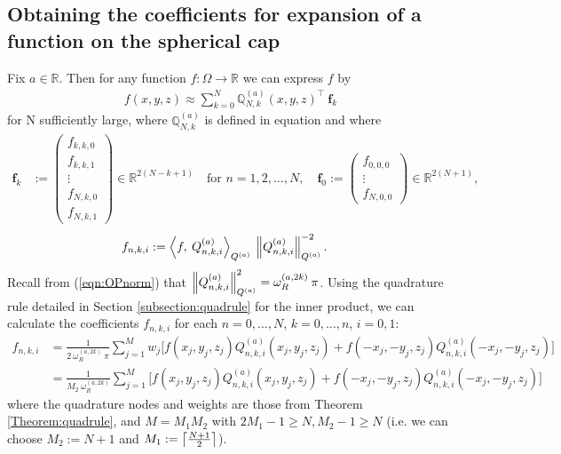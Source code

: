 \documentclass[11pt, oneside]{article}   	%
\newcommand{\R}{\mathbb{R}}
\newcommand{\genjac}{R}
\newcommand{\normgenjac}{\omega_\genjac}
\newcommand{\scop}{Q}
\newcommand{\scopnki}{\scop_{n,k,i}}
\newcommand{\scopa}{\scop^{(a)}}
\newcommand{\scopnkia}{\scopnki^{(a)}}
\newcommand{\bigscop}{{\mathbb{Q}}}
\newcommand{\bigscopa}{\bigscop^{(a)}}
\newcommand{\bigscopNka}{\bigscopa_{N,k}}
\begin{document}
\subsection{Obtaining the coefficients for expansion of a function on the spherical cap}\label{subsection:expandingfunctions}

Fix $a \in \R$. Then for any function $f : \Omega \to \R$ we can express $f$ by
\begin{align*}
	f(x,y,z) \approx \sum_{k=0}^N \bigscopNka(x,y,z)^\top \: \mathbf{f}_k
\end{align*}
for N sufficiently large, where $\bigscopNka$ is defined in equation \label{eqn:OPdefNka} and where
\begin{align*}
	\mathbf{f}_k &:= 
		\begin{pmatrix}
			f_{k,k,0} \\
			f_{k,k,1} \\
			\vdots \\
			f_{N,k,0} \\
			f_{N,k,1}
		\end{pmatrix} \in \R^{2(N-k+1)} \quad \text{for } n = 1,2,\dots,N, \quad
	\mathbf{f}_0 := 
		\begin{pmatrix}
			f_{0,0,0} \\
			\vdots \\
			f_{N,0,0}
		\end{pmatrix} \in \R^{2(N+1)},
\end{align*}
\begin{align*}
	f_{n,k,i} &:= \ip< f, \: \scopnkia>_{\scopa} \: \norm{\scopnkia}^{-2}_{\scopa}.
\end{align*}
Recall from (\ref{eqn:OPnorm}) that $\norm{\scopnkia}^2_{\scopa} = \normgenjac^{(a,2k)} \: \pi$. Using the quadrature rule detailed in Section \ref{subsection:quadrule} for the inner product, we can calculate the coefficients $f_{n,k,i}$ for each $n = 0,\dots,N$, $k = 0,\dots,n$, $i = 0,1$: 
\begin{align*}
	f_{n,k,i} &= \frac{1}{2 \: \normgenjac^{(a,2k)} \: \pi} \sum_{j=1}^{M} w_j \big[ f(x_j, y_j, z_j) \scopnkia(x_j, y_j, z_j) +f(-x_j, -y_j, z_j) \scopnkia(-x_j, -y_j, z_j) \big] \\
	&= \frac{1}{M_2 \: \normgenjac^{(a,2k)}} \sum_{j=1}^{M} \big[ f(x_j, y_j, z_j) \scopnkia(x_j, y_j, z_j) +f(-x_j, -y_j, z_j) \scopnkia(-x_j, -y_j, z_j) \big]
\end{align*}
where the quadrature nodes and weights are those from Theorem \ref{Theorem:quadrule}, and $M = M_1 M_2$ with $2M_1 - 1 \ge N, M_2 - 1 \ge N$ (i.e. we can choose $M_2 := N + 1$ and $M_1 := \left\lceil\frac{N+1}{2}\right\rceil$).
\end{document}
